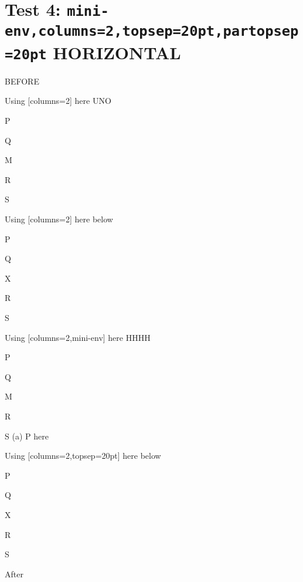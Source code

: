 \documentclass[10pt]{article}
\begin{document}
\section{Test 4: \texttt{mini-env,columns=2,topsep=20pt,partopsep=20pt} HORIZONTAL}

BEFORE
\begin{enumext}[columns=2]
\item Using [columns=2] here UNO
  \begin{enumext}[columns=2,topsep=20pt,partopsep=20pt]%
     \item  P \item Q \item M \item R \item S
  \end{enumext}

\item Using [columns=2] here below
\begin{enumext}[columns=2,topsep=20pt]%
     \item  P \item Q \item X  \item R \item S
  \end{enumext}

\columnbreak

\item Using [columns=2,mini-env] here HHHH
  \begin{enumext}[columns=2,mini-env={0.4\linewidth},topsep=20pt,partopsep=20pt]%
    \item  P \item Q \item M \item R \item S
    \miniright
    (a) P here
  \end{enumext}

\item Using [columns=2,topsep=20pt] here below
\begin{enumext}[columns=2,topsep=20pt]%
     \item  P \item Q \item X  \item R \item S
  \end{enumext}

\end{enumext}
After
\end{document}

